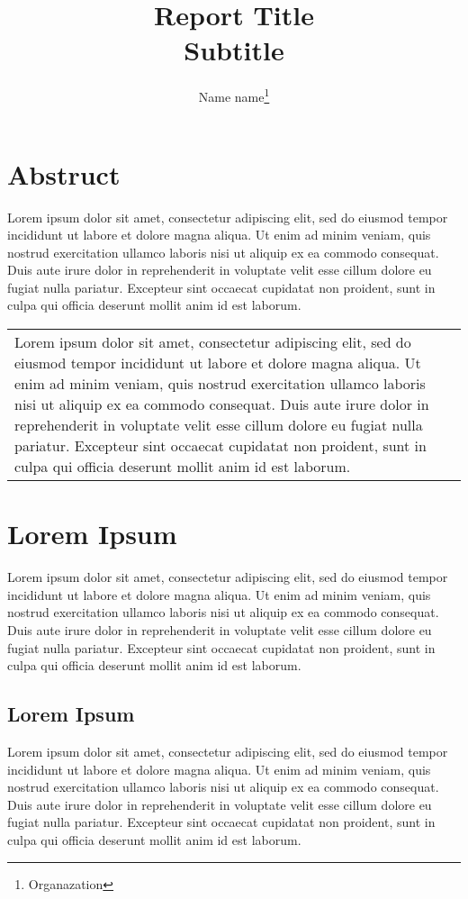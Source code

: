 \documentclass[a4paper, dvipdfmx, 11pt]{jsarticle}
\title{
  \textbf{
  Report Title \\
  Subtitle
  }
}
\author{
  \setcounter{footnote}{1}
  Name name\thanks{Organazation}
}
\theoremstyle{definition}
\begin{document}
  \maketitle
  \section{Abstruct}
  Lorem ipsum dolor sit amet, consectetur adipiscing elit, sed do eiusmod tempor incididunt ut labore et dolore magna aliqua.
  Ut enim ad minim veniam, quis nostrud exercitation ullamco laboris nisi ut aliquip ex ea commodo consequat.
  Duis aute irure dolor in reprehenderit in voluptate velit esse cillum dolore eu fugiat nulla pariatur.
  Excepteur sint occaecat cupidatat non proident, sunt in culpa qui officia deserunt mollit anim id est laborum.
  \begin{table}[!ht]
    \begin{tabular}{ll}
    Lorem ipsum dolor sit amet, consectetur adipiscing elit, sed do eiusmod tempor incididunt ut labore et dolore magna aliqua.
    Ut enim ad minim veniam, quis nostrud exercitation ullamco laboris nisi ut aliquip ex ea commodo consequat.
    Duis aute irure dolor in reprehenderit in voluptate velit esse cillum dolore eu fugiat nulla pariatur.
    Excepteur sint occaecat cupidatat non proident, sunt in culpa qui officia deserunt mollit anim id est laborum.
    \end{tabular}
  \end{table}

  \section{Lorem Ipsum}
  Lorem ipsum dolor sit amet, consectetur adipiscing elit, sed do eiusmod tempor incididunt ut labore et dolore magna aliqua.
  Ut enim ad minim veniam, quis nostrud exercitation ullamco laboris nisi ut aliquip ex ea commodo consequat.
  Duis aute irure dolor in reprehenderit in voluptate velit esse cillum dolore eu fugiat nulla pariatur.
  Excepteur sint occaecat cupidatat non proident, sunt in culpa qui officia deserunt mollit anim id est laborum.

  \subsection{Lorem Ipsum}
  Lorem ipsum dolor sit amet, consectetur adipiscing elit, sed do eiusmod tempor incididunt ut labore et dolore magna aliqua.
  Ut enim ad minim veniam, quis nostrud exercitation ullamco laboris nisi ut aliquip ex ea commodo consequat.
  Duis aute irure dolor in reprehenderit in voluptate velit esse cillum dolore eu fugiat nulla pariatur.
  Excepteur sint occaecat cupidatat non proident, sunt in culpa qui officia deserunt mollit anim id est laborum.
\end{document}
